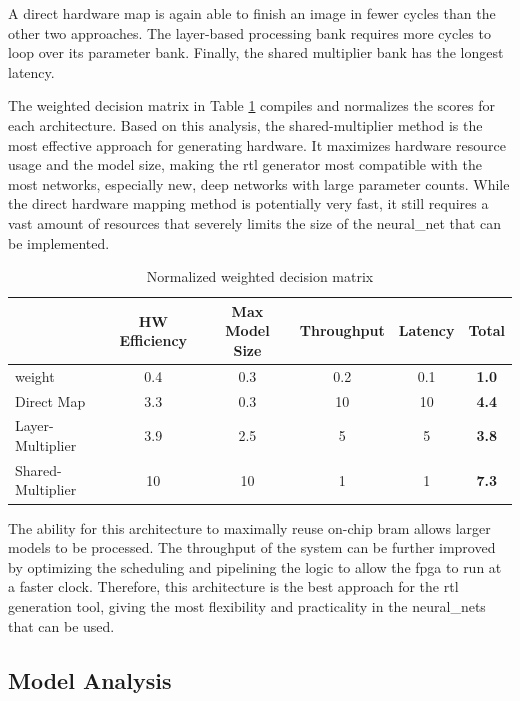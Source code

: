 \documentclass{uw-ece-wkrpt}
\begin{document}
A direct hardware map is again able to finish an image in fewer cycles than the other two approaches. The layer-based processing bank requires more cycles to loop over its parameter bank. Finally, the shared multiplier bank has the longest latency.

The weighted decision matrix in Table \ref{tab:decision_matrix} compiles and normalizes the scores for each architecture. Based on this analysis, the shared-multiplier method is the most effective approach for generating hardware. It maximizes hardware resource usage and the model size, making the \gls{rtl} generator most compatible with the most networks, especially new, deep networks with large parameter counts. While the direct hardware mapping method is potentially very fast, it still requires a vast amount of resources that severely limits the size of the \gls{neural_net} that can be implemented.

\begin{table}
\centering
\caption{Normalized weighted decision matrix}\label{tab:decision_matrix}
\begin{tabular}{lccccc}
\toprule
& HW Efficiency & Max Model Size & Throughput & Latency & \textbf{Total} \\
\midrule
\Gls{weight}            & 0.4           & 0.3            & 0.2        & 0.1     & \textbf{1.0} \\
Direct Map        & 3.3           & 0.3            & 10         & 10      & \textbf{4.4} \\
Layer-Multiplier  & 3.9           & 2.5            & 5          & 5       & \textbf{3.8} \\
Shared-Multiplier & 10            & 10             & 1          & 1       & \textbf{7.3} \\
\bottomrule
\end{tabular}
\end{table}

The ability for this architecture to maximally reuse on-chip \gls{bram} allows larger models to be processed. The throughput of the system can be further improved by optimizing the scheduling and pipelining the logic to allow the \gls{fpga} to run at a faster clock.  Therefore, this architecture is the best approach for the \gls{rtl} generation tool, giving the most flexibility and practicality in the \glspl{neural_net} that can be used.

\subsection{Model Analysis}
\end{document}
